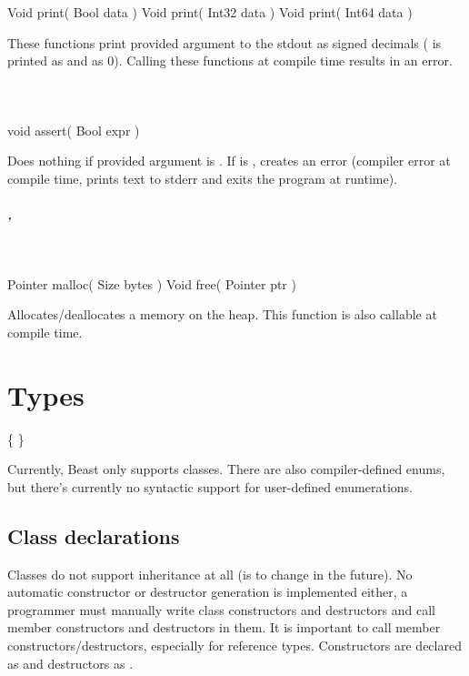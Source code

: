 \begin{code}
Void print( Bool data )
Void print( Int32 data )
Void print( Int64 data )
\end{code}
These functions print provided argument to the stdout as signed decimals ( is printed as  and  as 0). Calling these functions at compile time results in an error.

\paragraph{}~

\begin{code}
void assert( Bool expr )
\end{code}
Does nothing if provided argument is . If  is , creates an error (compiler error at compile time, prints text to stderr and exits the program at runtime).

\paragraph{, }~

\begin{code}
	Pointer malloc( Size bytes )
	Void free( Pointer ptr )
\end{code}
Allocates/deallocates a memory on the heap. This function is also callable at compile time.

\chapter{Types}

\begin{grammar}
	 \{  \}   \kwd{\{}  \kwd{\}}
\end{grammar}

Currently, Beast only supports classes. There are also compiler-defined enums, but there's currently no syntactic support for user-defined enumerations.

\section{Class declarations}
Classes do not support inheritance at all (is to change in the future). No automatic constructor or destructor generation is implemented either, a programmer must manually write class constructors and destructors and call member constructors and destructors in them. It is important to call member constructors/destructors, especially for reference types. Constructors are declared as  and destructors as .

